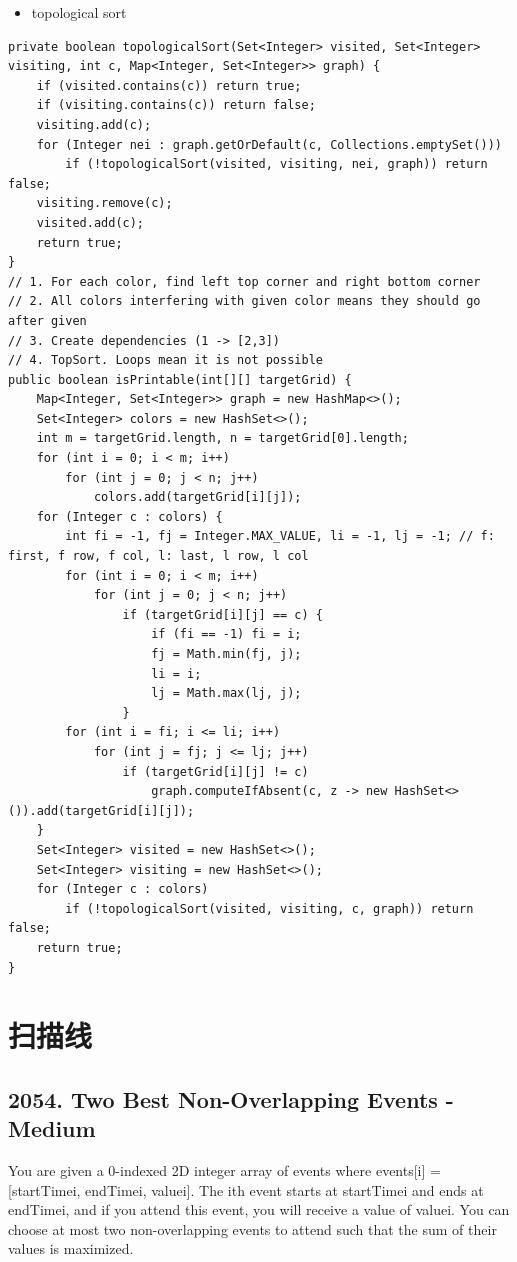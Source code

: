 \documentclass[9pt, b5paaper]{book}
\begin{document}
\begin{itemize}
\item topological sort
\end{itemize}
\begin{verbatim}
private boolean topologicalSort(Set<Integer> visited, Set<Integer> visiting, int c, Map<Integer, Set<Integer>> graph) {
    if (visited.contains(c)) return true;
    if (visiting.contains(c)) return false;
    visiting.add(c);
    for (Integer nei : graph.getOrDefault(c, Collections.emptySet())) 
        if (!topologicalSort(visited, visiting, nei, graph)) return  false;
    visiting.remove(c);
    visited.add(c);
    return true;
}
// 1. For each color, find left top corner and right bottom corner
// 2. All colors interfering with given color means they should go after given
// 3. Create dependencies (1 -> [2,3])
// 4. TopSort. Loops mean it is not possible
public boolean isPrintable(int[][] targetGrid) {
    Map<Integer, Set<Integer>> graph = new HashMap<>();
    Set<Integer> colors = new HashSet<>();
    int m = targetGrid.length, n = targetGrid[0].length;
    for (int i = 0; i < m; i++) 
        for (int j = 0; j < n; j++) 
            colors.add(targetGrid[i][j]);
    for (Integer c : colors) {
        int fi = -1, fj = Integer.MAX_VALUE, li = -1, lj = -1; // f: first, f row, f col, l: last, l row, l col
        for (int i = 0; i < m; i++) 
            for (int j = 0; j < n; j++) 
                if (targetGrid[i][j] == c) {
                    if (fi == -1) fi = i;
                    fj = Math.min(fj, j);
                    li = i;
                    lj = Math.max(lj, j);
                }
        for (int i = fi; i <= li; i++) 
            for (int j = fj; j <= lj; j++) 
                if (targetGrid[i][j] != c) 
                    graph.computeIfAbsent(c, z -> new HashSet<>()).add(targetGrid[i][j]);
    }
    Set<Integer> visited = new HashSet<>();
    Set<Integer> visiting = new HashSet<>();
    for (Integer c : colors) 
        if (!topologicalSort(visited, visiting, c, graph)) return false;
    return true;
}
\end{verbatim}


\chapter{扫描线}
\label{sec-8}
\section{2054. Two Best Non-Overlapping Events - Medium}
\label{sec-8-1}
You are given a 0-indexed 2D integer array of events where events[i] = [startTimei, endTimei, valuei]. The ith event starts at startTimei and ends at endTimei, and if you attend this event, you will receive a value of valuei. You can choose at most two non-overlapping events to attend such that the sum of their values is maximized.
\end{document}
